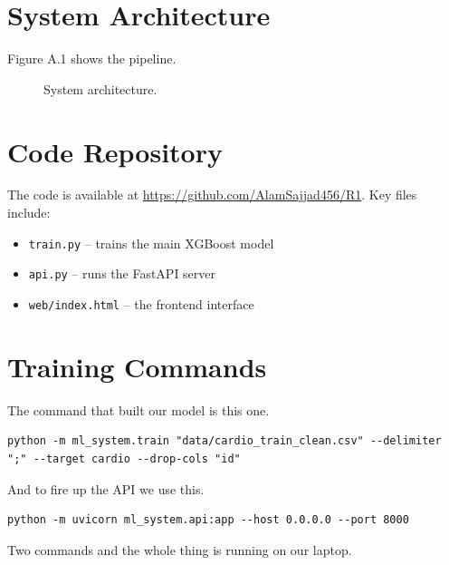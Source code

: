 \documentclass[12pt, a4paper, oneside]{book}
\begin{document}
\section{System Architecture}
Figure A.1 shows the pipeline.

\begin{figure}[htbp]
\centering
{}
\caption{System architecture.}
\label{fig:system_arch}
\end{figure}

\section{Code Repository}
The code is available at \url{https://github.com/AlamSajjad456/R1}. Key files include:

\begin{itemize}
  \item \texttt{train.py} – trains the main XGBoost model
  \item \texttt{api.py} – runs the FastAPI server
  \item \texttt{web/index.html} – the frontend interface
\end{itemize}

\section{Training Commands}
The command that built our model is this one.
\begin{scriptsize}
\begin{verbatim}
python -m ml_system.train "data/cardio_train_clean.csv" --delimiter ";" --target cardio --drop-cols "id"
\end{verbatim}
\end{scriptsize}
And to fire up the API we use this.
\begin{scriptsize}
\begin{verbatim}
python -m uvicorn ml_system.api:app --host 0.0.0.0 --port 8000
\end{verbatim}
\end{scriptsize}
Two commands and the whole thing is running on our laptop.
\end{document}
